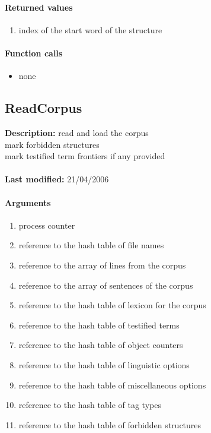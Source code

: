 \paragraph{Returned values}
\begin{enumerate}
\item index of the start word of the structure
\end{enumerate}

\paragraph{Function calls}
\begin{itemize}
\item none
\end{itemize}

\subsection{ReadCorpus}
\textbf{Description:} read and load the corpus\\
mark forbidden structures\\
mark testified term frontiers if any provided\\
\\\textbf{Last modified:} 21/04/2006

\paragraph{Arguments}
\begin{enumerate}
\item process counter
\item reference to the hash table of file names
\item reference to the array of lines from the corpus
\item reference to the array of sentences of the corpus
\item reference to the hash table of lexicon for the corpus
\item reference to the hash table of testified terms
\item reference to the hash table of object counters
\item reference to the hash table of linguistic options
\item reference to the hash table of miscellaneous options
\item reference to the hash table of tag types
\item reference to the hash table of forbidden structures
\end{enumerate}

